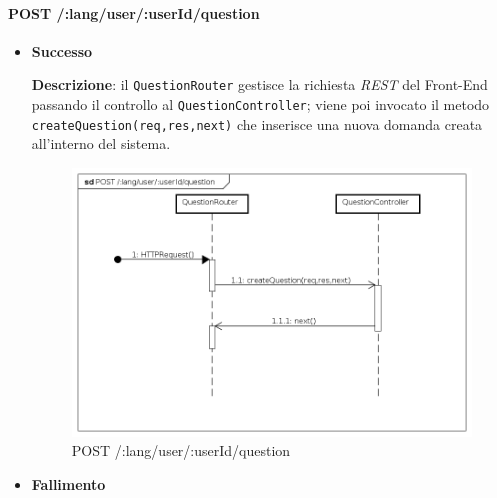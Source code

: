 \paragraph{POST /:lang/user/:userId/question}
\begin{itemize}
\item \textbf{Successo}

\textbf{Descrizione}: il \texttt{QuestionRouter} gestisce la richiesta \textit{REST} del Front-End passando il controllo al \texttt{QuestionController}; viene poi invocato il metodo\\ \texttt{createQuestion(req,res,next)} che inserisce una nuova domanda creata all'interno del sistema.

\begin{figure}[ht]
	\centering
	\includegraphics[scale=0.45]{UML/DiagrammiDiSequenza/Back-end/POST__lang_user_question.png}
	\caption{POST /:lang/user/:userId/question}
\end{figure}
\FloatBarrier

\item \textbf{Fallimento}
\end{itemize}
